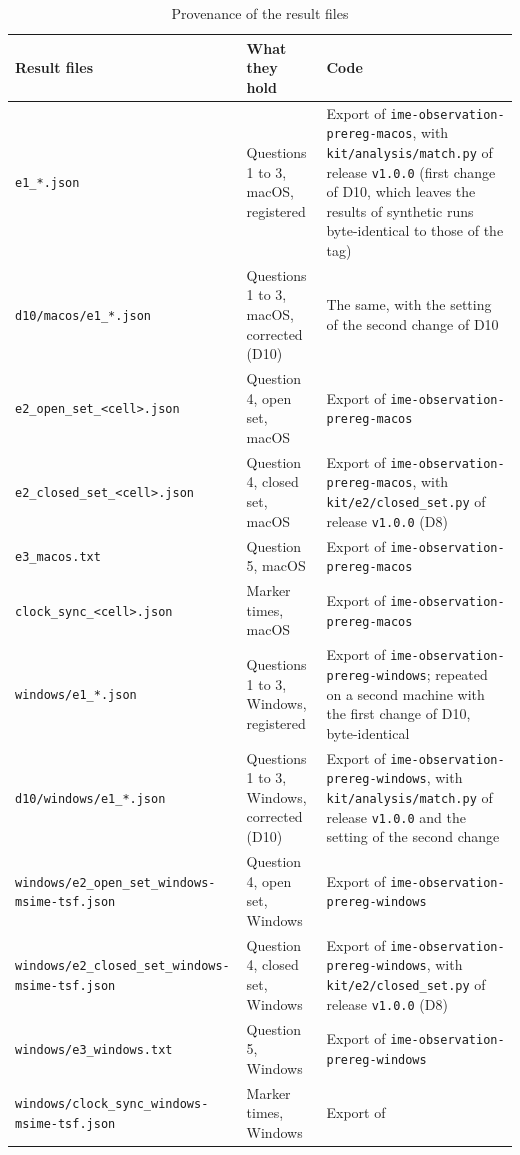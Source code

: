 {\footnotesize
\begin{longtable}{L{0.30}L{0.20}L{0.50}}
\caption{Provenance of the result files}\label{tab:provenance}\\
\toprule
Result files & What they hold & Code \\
\midrule
\endhead
\texttt{e1\_*.json} & Questions 1 to 3, macOS, registered & Export of \texttt{ime-observation-prereg-macos}, with
\texttt{kit/analysis/match.py} of release \texttt{v1.0.0} (first change of D10, which leaves the results of synthetic
runs byte-identical to those of the tag) \\
\texttt{d10/macos/e1\_*.json} & Questions 1 to 3, macOS, corrected (D10) & The same, with the setting of the second
change of D10 \\
\texttt{e2\_open\_set\_<cell>.json} & Question 4, open set, macOS & Export of \texttt{ime-observation-prereg-macos} \\
\texttt{e2\_closed\_set\_<cell>.json} & Question 4, closed set, macOS & Export of \texttt{ime-observation-prereg-macos},
with \texttt{kit/e2/closed\_set.py} of release \texttt{v1.0.0} (D8) \\
\texttt{e3\_macos.txt} & Question 5, macOS & Export of \texttt{ime-observation-prereg-macos} \\
\texttt{clock\_sync\_<cell>.json} & Marker times, macOS & Export of \texttt{ime-observation-prereg-macos} \\
\texttt{windows/e1\_*.json} & Questions 1 to 3, Windows, registered & Export of \texttt{ime-observation-prereg-windows};
repeated on a second machine with the first change of D10, byte-identical \\
\texttt{d10/windows/e1\_*.json} & Questions 1 to 3, Windows, corrected (D10) & Export of
\texttt{ime-observation-prereg-windows}, with \texttt{kit/analysis/match.py} of release \texttt{v1.0.0} and the
setting of the second change \\
\texttt{windows/e2\_open\_set\_windows-msime-tsf.json} & Question 4, open set, Windows & Export of
\texttt{ime-observation-prereg-windows} \\
\texttt{windows/e2\_closed\_set\_windows-msime-tsf.json} & Question 4, closed set, Windows & Export of
\texttt{ime-observation-prereg-windows}, with \texttt{kit/e2/closed\_set.py} of release \texttt{v1.0.0} (D8) \\
\texttt{windows/e3\_windows.txt} & Question 5, Windows & Export of \texttt{ime-observation-prereg-windows} \\
\texttt{windows/clock\_sync\_windows-msime-tsf.json} & Marker times, Windows & Export of

\end{longtable}}
